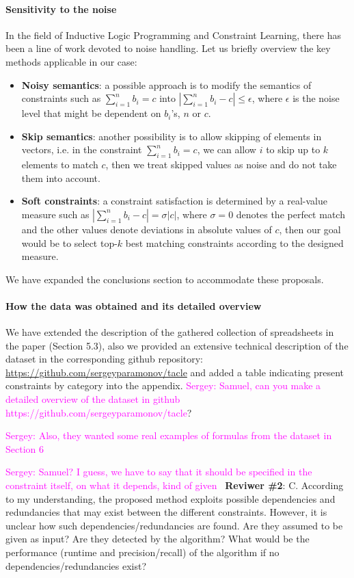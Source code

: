\documentclass{article}
\newcommand{\sergey}[1]{\textcolor{magenta}{{\sc Sergey:} #1}\xspace}
\begin{document}
\paragraph{Sensitivity to the noise}
In the field of Inductive Logic Programming and Constraint Learning, there has been a line of work devoted to noise handling. Let us briefly overview the key methods applicable in our case:
\begin{itemize}
  \item \textbf{Noisy semantics}: a possible approach is to modify the semantics of constraints such as $\sum_{i=1}^n b_i = c$ into $|\sum_{i=1}^n b_i - c| \leq \epsilon$, where $\epsilon$ is the noise level that might be dependent on $b_i$'s, $n$ or $c$.
  \item \textbf{Skip semantics}: another possibility is to allow skipping of elements in vectors, i.e. in the constraint  $\sum_{i=1}^n b_i = c$, we can allow $i$ to skip up to $k$ elements to match $c$, then we treat skipped values as noise and do not take them into account.
  \item \textbf{Soft constraints}: a constraint satisfaction is determined by a real-value measure such as $|\sum_{i=1}^n b_i - c | = \sigma|c|$, where $\sigma=0$ denotes the perfect match and the other values denote deviations in absolute values of $c$, then our goal would be to select top-$k$ best matching constraints according to the designed measure.
\end{itemize}

We have expanded the conclusions section to accommodate these proposals.


\paragraph{How the data was obtained and its detailed overview}
We have extended the description of the gathered collection of spreadsheets in the paper (Section 5.3), also we provided an extensive technical description of the dataset in the corresponding github repository: \url{https://github.com/sergeyparamonov/tacle} and added a table indicating present constraints by category into the appendix.
\sergey{Samuel, can you make a detailed overview of the dataset in github https://github.com/sergeyparamonov/tacle}?

\sergey{Also, they wanted some real examples of formulas from the dataset in Section 6}


\sergey{Samuel? I guess, we have to say that it should be specified in the constraint itself, on what it depends, kind of given}~ \textbf{Reviwer \#2}: C. According to my understanding, the proposed method exploits possible dependencies and redundancies that may exist between the different constraints. However, it is unclear how such dependencies/redundancies are found. Are they assumed to be given as input? Are they detected by the algorithm? What would be the performance (runtime and precision/recall) of the algorithm if no dependencies/redundancies exist?
\end{document}
